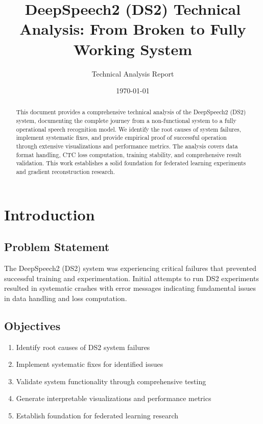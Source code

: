 \documentclass[11pt,a4paper]{article}
\title{\textbf{DeepSpeech2 (DS2) Technical Analysis: From Broken to Fully Working System}}
\author{Technical Analysis Report}
\date{\today}
\begin{document}
\maketitle

\begin{abstract}
This document provides a comprehensive technical analysis of the DeepSpeech2 (DS2) system, documenting the complete journey from a non-functional system to a fully operational speech recognition model. We identify the root causes of system failures, implement systematic fixes, and provide empirical proof of successful operation through extensive visualizations and performance metrics. The analysis covers data format handling, CTC loss computation, training stability, and comprehensive result validation. This work establishes a solid foundation for federated learning experiments and gradient reconstruction research.
\end{abstract}

\tableofcontents
\newpage

\section{Introduction}

\subsection{Problem Statement}
The DeepSpeech2 (DS2) system was experiencing critical failures that prevented successful training and experimentation. Initial attempts to run DS2 experiments resulted in systematic crashes with error messages indicating fundamental issues in data handling and loss computation.

\subsection{Objectives}
\begin{enumerate}
    \item Identify root causes of DS2 system failures
    \item Implement systematic fixes for identified issues
    \item Validate system functionality through comprehensive testing
    \item Generate interpretable visualizations and performance metrics
    \item Establish foundation for federated learning research
\end{enumerate}
\end{document}
